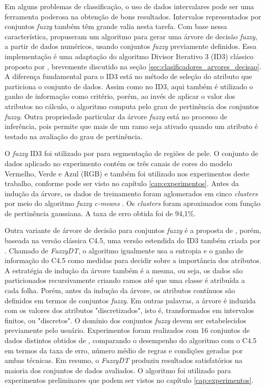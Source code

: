 Em alguns problemas de classificação, o uso de dados intervalares pode ser uma ferramenta poderosa na obtenção de bons resultados. Intervalos representados por conjuntos \emph{fuzzy} também têm grande valia nesta tarefa. Com base nessa característica, \citet{umano:94} propuseram um algoritmo para gerar uma árvore de decisão \emph{fuzzy}, a partir de dados numéricos, usando conjuntos \emph{fuzzy} previamente definidos. Essa implementação é uma adaptação do algoritmo Divisor Iterativo 3 (ID3) clássico proposto por \citet{quinlan:86}, brevemente discutido na seção \ref{sec:clasificadores_arvores_decisao}. A diferença fundamental para o ID3 está no método de seleção do atributo que particiona o conjunto de dados. Assim como no ID3, aqui também é utilizado o ganho de informação como critério, porém, ao invés de aplicar o valor dos atributos no cálculo, o algoritmo computa pelo grau de pertinência dos conjuntos \emph{fuzzy}. Outra propriedade particular da árvore \emph{fuzzy} está no processo de inferência, pois permite que mais de um ramo seja ativado quando um atributo é testado na avaliação do grau de pertinência.

O \emph{fuzzy} ID3 foi utilizado por \citet{bhatt:09} para segmentação de regiões de pele. O conjunto de dados aplicado no experimento contém os três canais de cores do modelo Vermelho, Verde e Azul (RGB) e também foi utilizado nos experimentos deste trabalho, conforme pode ser visto no capítulo \ref{cap:experimentos}. Antes da indução da árvore, os dados de treinamento foram aglomerados em cinco \emph{clusters} por meio do algoritmo \emph{fuzzy c-means} \citep{bezdek:84}. Os \emph{clusters} foram aproximados com função de pertinência gaussiana. A taxa de erro obtida foi de 94,1\%.

Outra variante de árvore de decisão para conjuntos \emph{fuzzy} é a proposta de \citet{cintra:13}, porém, baseada na versão clássica C4.5, uma versão estendida do ID3 também criada por \citet{quinlan:93}. Chamado de \emph{FuzzyDT}, o algoritmo igualmente usa a entropia e o ganho de informação do C4.5 como medidas para decidir sobre a importância dos atributos. A estratégia de indução da árvore também é a mesma, ou seja, os dados são particionados recursivamente criando ramos até que uma classe é atribuída a cada folha. Porém, antes da indução da árvore, os atributos contínuos são definidos em termos de conjuntos \emph{fuzzy}. Em outras palavras, a árvore é induzida com os valores dos atributos "discretizados", isto é, transformados em intervalos finitos, ou "discretos". O domínio dos conjuntos \emph{fuzzy} devem ser estabelecidos previamente pelo usuário. Experimentos foram realizados com 16 conjuntos de dados distintos obtidos de \citet{lichman:13}, comparando o desempenho do algoritmo com o C4.5 em termos da taxa de erro, número médio de regras e condições geradas por ambas técnicas. Em resumo, o \emph{FuzzyDT} produziu resultados satisfatórios na maioria dos conjuntos de dados avaliados. O algoritmo foi utilizado para experimentos preliminares que podem ser vistos no capítulo \ref{cap:experimentos}.

